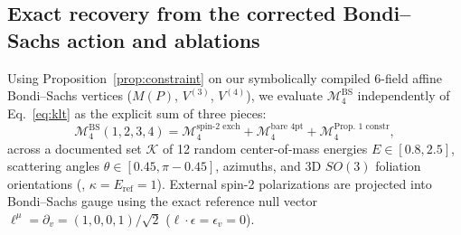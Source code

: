 \documentclass[11pt]{article}
\newcommand{\calK}{\mathcal{K}}
\newcommand{\calM}{\mathcal{M}}
\begin{document}
\subsection{Exact recovery from the corrected Bondi--Sachs action and ablations}

Using Proposition~\ref{prop:constraint} on our symbolically compiled 6-field affine Bondi--Sachs vertices ($M(P)$, $V^{(3)}$, $V^{(4)}$), we evaluate $\calM_4^{\mathrm{BS}}$ independently of Eq.~\eqref{eq:klt} as the explicit sum of three pieces:
\begin{equation}\label{eq:m4_decomp}
\calM_4^{\mathrm{BS}}(1,2,3,4) = \calM_4^{\text{spin-2 exch}} + \calM_4^{\text{bare 4pt}} + \calM_4^{\text{Prop.~1 constr}},
\end{equation}
across a documented set $\calK$ of 12 random center-of-mass energies $E \in [0.8, 2.5]$, scattering angles $\theta \in [0.45, \pi-0.45]$, azimuths, and 3D $SO(3)$ foliation orientations (, $\kappa = E_{\mathrm{ref}} = 1$). External spin-2 polarizations are projected into Bondi--Sachs gauge using the exact reference null vector $\ell^\mu = \partial_v = (1,0,0,1)/\sqrt{2}$ ($\ell\cdot\epsilon = \epsilon_v = 0$).
\end{document}
